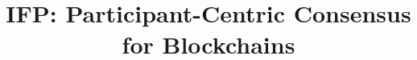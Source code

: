 \documentclass[acmsmall, screen, nonacm, anonymous]{acmart}
\title{IFP: Participant-Centric Consensus for Blockchains}
\begin{document}
    \begin{abstract}
    \end{abstract}
    \maketitle
    
    
    
    
    
    
    
    
\end{document}
